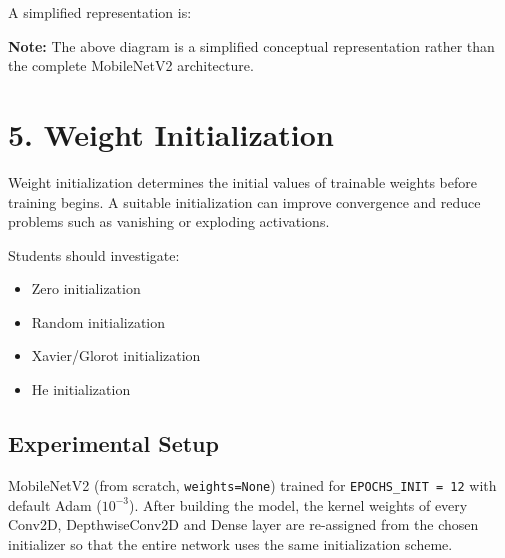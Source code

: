 \documentclass[10pt]{article}
\begin{document}
A simplified representation is:
\begin{center}
\end{center}

\textbf{Note:} The above diagram is a simplified conceptual representation
rather than the complete MobileNetV2 architecture.

\section*{5. Weight Initialization}
Weight initialization determines the initial values of trainable weights
before training begins. A suitable initialization can improve convergence
and reduce problems such as vanishing or exploding activations.

Students should investigate:
\begin{itemize}
\item Zero initialization
\item Random initialization
\item Xavier/Glorot initialization
\item He initialization
\end{itemize}

\subsection*{Experimental Setup}
MobileNetV2 (from scratch, \texttt{weights=None}) trained for
\texttt{EPOCHS\_INIT = 12} with default Adam ($10^{-3}$). After
building the model, the kernel weights of every Conv2D, DepthwiseConv2D
and Dense layer are re-assigned from the chosen initializer so that the
entire network uses the same initialization scheme.
\end{document}
